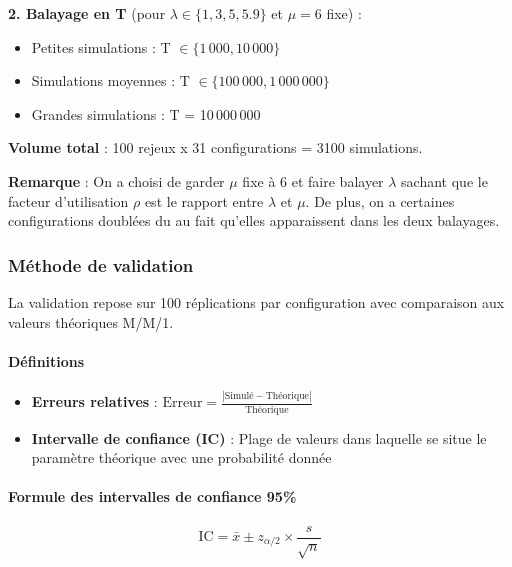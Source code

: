 \documentclass[12pt,a4paper]{article}
\begin{document}
\textbf{2. Balayage en T} (pour $\lambda \in \{1, 3, 5, 5.9\}$ et $\mu=6$ fixe) :
\begin{itemize}[leftmargin=2em]
    \item Petites simulations : T $\in \{1\,000, 10\,000\}$
    \item Simulations moyennes : T $\in \{100\,000, 1\,000\,000\}$
    \item Grandes simulations : T = 10\,000\,000
\end{itemize}
\vspace{0.3cm}
\textbf{Volume total} : 100 rejeux x 31 configurations = 3100 simulations.

\textbf{Remarque} : On a choisi de garder $\mu$ fixe à 6 et faire balayer $\lambda$ sachant que le facteur d'utilisation $\rho$ est le rapport entre $\lambda$ et $\mu$. De plus, on a certaines configurations doublées du au fait qu'elles apparaissent dans les deux balayages.

\subsubsection{Méthode de validation}

La validation repose sur 100 réplications par configuration avec comparaison aux valeurs théoriques M/M/1.

\paragraph{Définitions}

\begin{itemize}
    \item \textbf{Erreurs relatives} : $\text{Erreur} = \frac{|\text{Simulé} - \text{Théorique}|}{\text{Théorique}}$
    \item \textbf{Intervalle de confiance (IC)} : Plage de valeurs dans laquelle se situe le paramètre théorique avec une probabilité donnée
\end{itemize}

\paragraph{Formule des intervalles de confiance 95\%}
$$\text{IC} = \bar{x} \pm z_{\alpha/2} \times \frac{s}{\sqrt{n}}$$
\end{document}

